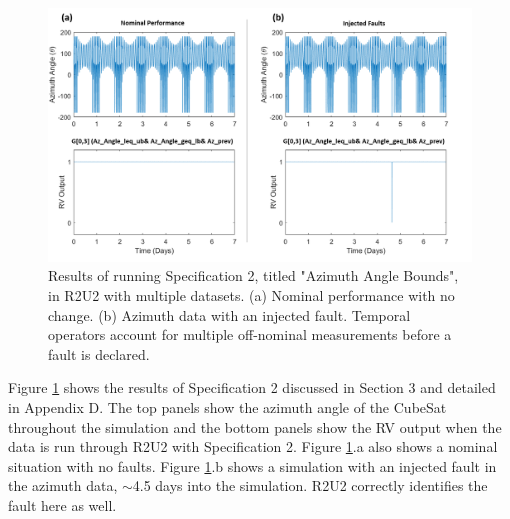 \documentclass[conf]{new-aiaa}
\begin{document}
\begin{figure}[!ht]
\centering
\includegraphics[width=.8\textwidth]{Fig/Az_Spec2.png}
\caption{Results of running Specification 2, titled "Azimuth Angle Bounds", in R2U2 with multiple datasets. (a) Nominal performance with no change. (b) Azimuth data with an injected fault. Temporal operators account for multiple off-nominal measurements before a fault is declared.}
\label{AzAngle}
\end{figure}

Figure \ref{AzAngle} shows the results of Specification 2 discussed in Section 3 and detailed in Appendix D. The top panels show the azimuth angle of the CubeSat throughout the simulation and the bottom panels show the RV output when the data is run through R2U2 with Specification 2. Figure \ref{AzAngle}.a also shows a nominal situation with no faults. Figure \ref{AzAngle}.b shows a simulation with an injected fault in the azimuth data, $\sim$4.5 days into the simulation. R2U2 correctly identifies the fault here as well.

\end{document}
